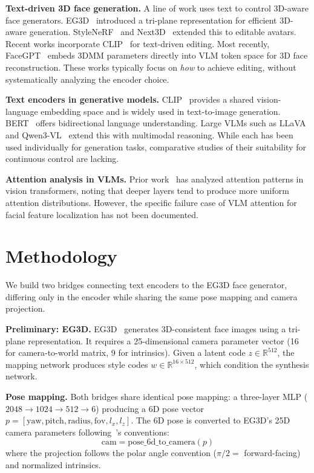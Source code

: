 \documentclass[10pt,twocolumn,letterpaper]{article}
\begin{document}
\textbf{Text-driven 3D face generation.} A line of work uses text to control 3D-aware face generators. EG3D~\cite{EG3D} introduced a tri-plane representation for efficient 3D-aware generation. StyleNeRF~\cite{StyleNeRF} and Next3D~\cite{Next3D} extended this to editable avatars. Recent works incorporate CLIP~\cite{CLIP} for text-driven editing. Most recently, FaceGPT~\cite{FaceGPT} embeds 3DMM parameters directly into VLM token space for 3D face reconstruction. These works typically focus on \emph{how} to achieve editing, without systematically analyzing the encoder choice.

\textbf{Text encoders in generative models.} CLIP~\cite{CLIP} provides a shared vision-language embedding space and is widely used in text-to-image generation. BERT~\cite{BERT} offers bidirectional language understanding. Large VLMs such as LLaVA~\cite{LLaVA} and Qwen3-VL~\cite{Qwen3VL} extend this with multimodal reasoning. While each has been used individually for generation tasks, comparative studies of their suitability for continuous control are lacking.

\textbf{Attention analysis in VLMs.} Prior work~\cite{CLIP} has analyzed attention patterns in vision transformers, noting that deeper layers tend to produce more uniform attention distributions. However, the specific failure case of VLM attention for facial feature localization has not been documented.

\section{Methodology}
\label{sec:method}

We build two bridges connecting text encoders to the EG3D face generator, differing only in the encoder while sharing the same pose mapping and camera projection.

\textbf{Preliminary: EG3D.} EG3D~\cite{EG3D} generates 3D-consistent face images using a tri-plane representation. It requires a 25-dimensional camera parameter vector (16 for camera-to-world matrix, 9 for intrinsics). Given a latent code $z \in \mathbb{R}^{512}$, the mapping network produces style codes $w \in \mathbb{R}^{16 \times 512}$, which condition the synthesis network.

\textbf{Pose mapping.} Both bridges share identical pose mapping: a three-layer MLP ($2048 \to 1024 \to 512 \to 6$) producing a 6D pose vector $p = [\text{yaw}, \text{pitch}, \text{radius}, \text{fov}, l_x, l_z]$. The 6D pose is converted to EG3D's 25D camera parameters following~\cite{EG3D}'s conventions:
\begin{equation}
\text{cam} = \text{pose\_6d\_to\_camera}(p)
\end{equation}
where the projection follows the polar angle convention ($\pi/2 =$ forward-facing) and normalized intrinsics.
\end{document}
